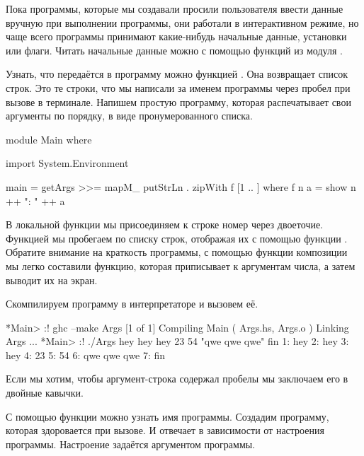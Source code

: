 Пока программы, которые мы создавали просили пользователя 
ввести данные вручную при выполнении программы,
они работали в интерактивном режиме, но чаще всего программы
принимают какие-нибудь начальные данные, установки или флаги. 
Читать начальные данные можно с помощью функций из модуля 
. 

Узнать, что передаётся в программу можно функцией 
. Она возвращает список строк. Это те строки, что
мы написали за именем программы через пробел при вызове в терминале.
Напишем простую программу, которая распечатывает свои аргументы
по порядку, в виде пронумерованного списка.

\begin{code}
module Main where

import System.Environment

main = getArgs >>= mapM_ putStrLn . zipWith f [1 .. ]
    where f n a = show n ++ ": " ++ a
\end{code}

В локальной функции  мы присоединяем к строке номер
через двоеточие. Функцией  мы пробегаем по списку
строк, отображая их с помощью функции . 
Обратите внимание на краткость программы, с помощью функции композиции
мы легко составили функцию, которая приписывает к аргументам
числа, а затем выводит их на экран.

Скомпилируем программу в интерпретаторе и вызовем её.

\begin{code}
*Main> :! ghc --make Args
[1 of 1] Compiling Main             ( Args.hs, Args.o )
Linking Args ...
*Main> :! ./Args hey hey hey 23 54 "qwe qwe qwe" fin
1: hey
2: hey
3: hey
4: 23
5: 54
6: qwe qwe qwe
7: fin
\end{code}

Если мы хотим, чтобы аргумент-строка содержал пробелы мы 
заключаем его в двойные кавычки. 


С помощью функции  можно узнать имя программы.
Создадим программу, которая здоровается при вызове. И отвечает
в зависимости от настроения программы. Настроение
задаётся аргументом программы. 


